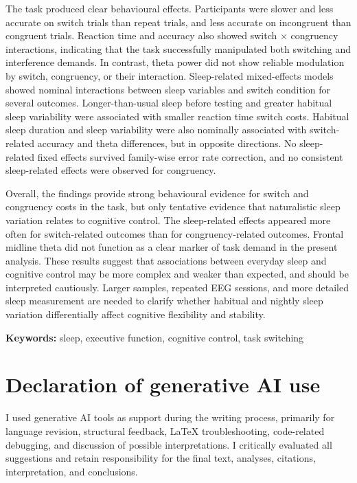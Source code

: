 \documentclass[12pt,a4paper]{report}
\begin{document}
The task produced clear behavioural effects. Participants were slower and less accurate on switch trials than repeat trials, and less accurate on incongruent than congruent trials. Reaction time and accuracy also showed switch \(\times\) congruency interactions, indicating that the task successfully manipulated both switching and interference demands. In contrast, theta power did not show reliable modulation by switch, congruency, or their interaction. Sleep-related mixed-effects models showed nominal interactions between sleep variables and switch condition for several outcomes. Longer-than-usual sleep before testing and greater habitual sleep variability were associated with smaller reaction time switch costs. Habitual sleep duration and sleep variability were also nominally associated with switch-related accuracy and theta differences, but in opposite directions. No sleep-related fixed effects survived family-wise error rate correction, and no consistent sleep-related effects were observed for congruency.

Overall, the findings provide strong behavioural evidence for switch and congruency costs in the task, but only tentative evidence that naturalistic sleep variation relates to cognitive control. The sleep-related effects appeared more often for switch-related outcomes than for congruency-related outcomes. Frontal midline theta did not function as a clear marker of task demand in the present analysis. These results suggest that associations between everyday sleep and cognitive control may be more complex and weaker than expected, and should be interpreted cautiously. Larger samples, repeated EEG sessions, and more detailed sleep measurement are needed to clarify whether habitual and nightly sleep variation differentially affect cognitive flexibility and stability. \newline



\textbf{Keywords:} sleep, executive function, cognitive control, task switching


\newpage
\thispagestyle{empty}
\section*{Declaration of generative AI use}

I used generative AI tools as support during the writing process, primarily for language revision, structural feedback, LaTeX troubleshooting, code-related debugging, and discussion of possible interpretations. I critically evaluated all suggestions and retain responsibility for the final text, analyses, citations, interpretation, and conclusions.
\end{document}
